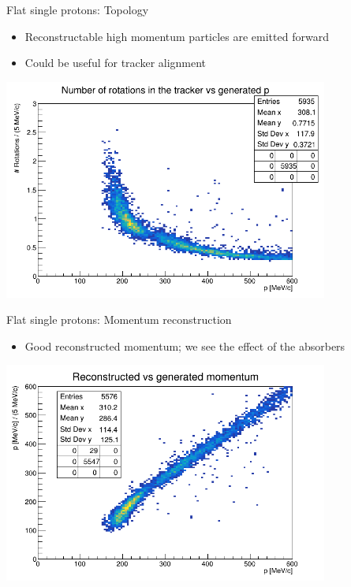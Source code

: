 \documentclass[10pt]{beamer}
\begin{document}
%
\begin{frame}{Flat single protons: Topology}
\begin{itemize}
\item Reconstructable high momentum particles are emitted forward
\item Could be useful for tracker alignment
\end{itemize}
\begin{center}
\includegraphics[width=0.8\textwidth]{plots/flat/Lambda_Rot-vs-p}
\end{center}
\end{frame}

%
\begin{frame}{Flat single protons: Momentum reconstruction}
\begin{itemize}
\item Good reconstructed momentum; we see the effect of the absorbers
\end{itemize}
\begin{center}
\includegraphics[width=0.8\textwidth]{plots/flat/Lambda_preco-vs-pgen}
\end{center}
\end{frame}
\end{document}
